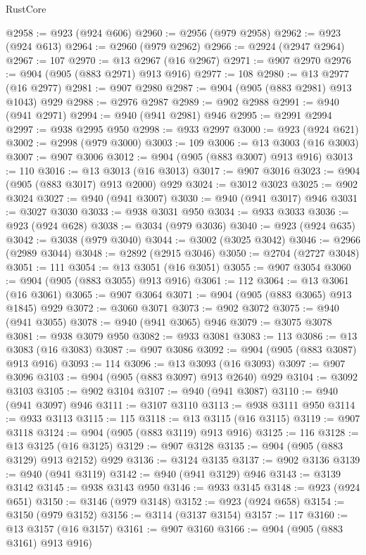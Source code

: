 \begin{lexlean}{RustCore}
\begin{coremodule}
@2958 := @923 (@924 @606)
@2960 := @2956 (@979 @2958)
@2962 := @923 (@924 @613)
@2964 := @2960 (@979 @2962)
@2966 := @2924 (@2947 @2964)
@2967 := 107
@2970 := @13 @2967 (@16 @2967)
@2971 := @907 @2970
@2976 := @904 (@905 (@883 @2971) @913 @916)
@2977 := 108
@2980 := @13 @2977 (@16 @2977)
@2981 := @907 @2980
@2987 := @904 (@905 (@883 @2981) @913 @1043) @929
@2988 := @2976 @2987
@2989 := @902 @2988
@2991 := @940 (@941 @2971)
@2994 := @940 (@941 @2981) @946
@2995 := @2991 @2994
@2997 := @938 @2995 @950
@2998 := @933 @2997
@3000 := @923 (@924 @621)
@3002 := @2998 (@979 @3000)
@3003 := 109
@3006 := @13 @3003 (@16 @3003)
@3007 := @907 @3006
@3012 := @904 (@905 (@883 @3007) @913 @916)
@3013 := 110
@3016 := @13 @3013 (@16 @3013)
@3017 := @907 @3016
@3023 := @904 (@905 (@883 @3017) @913 @2000) @929
@3024 := @3012 @3023
@3025 := @902 @3024
@3027 := @940 (@941 @3007)
@3030 := @940 (@941 @3017) @946
@3031 := @3027 @3030
@3033 := @938 @3031 @950
@3034 := @933 @3033
@3036 := @923 (@924 @628)
@3038 := @3034 (@979 @3036)
@3040 := @923 (@924 @635)
@3042 := @3038 (@979 @3040)
@3044 := @3002 (@3025 @3042)
@3046 := @2966 (@2989 @3044)
@3048 := @2892 (@2915 @3046)
@3050 := @2704 (@2727 @3048)
@3051 := 111
@3054 := @13 @3051 (@16 @3051)
@3055 := @907 @3054
@3060 := @904 (@905 (@883 @3055) @913 @916)
@3061 := 112
@3064 := @13 @3061 (@16 @3061)
@3065 := @907 @3064
@3071 := @904 (@905 (@883 @3065) @913 @1845) @929
@3072 := @3060 @3071
@3073 := @902 @3072
@3075 := @940 (@941 @3055)
@3078 := @940 (@941 @3065) @946
@3079 := @3075 @3078
@3081 := @938 @3079 @950
@3082 := @933 @3081
@3083 := 113
@3086 := @13 @3083 (@16 @3083)
@3087 := @907 @3086
@3092 := @904 (@905 (@883 @3087) @913 @916)
@3093 := 114
@3096 := @13 @3093 (@16 @3093)
@3097 := @907 @3096
@3103 := @904 (@905 (@883 @3097) @913 @2640) @929
@3104 := @3092 @3103
@3105 := @902 @3104
@3107 := @940 (@941 @3087)
@3110 := @940 (@941 @3097) @946
@3111 := @3107 @3110
@3113 := @938 @3111 @950
@3114 := @933 @3113
@3115 := 115
@3118 := @13 @3115 (@16 @3115)
@3119 := @907 @3118
@3124 := @904 (@905 (@883 @3119) @913 @916)
@3125 := 116
@3128 := @13 @3125 (@16 @3125)
@3129 := @907 @3128
@3135 := @904 (@905 (@883 @3129) @913 @2152) @929
@3136 := @3124 @3135
@3137 := @902 @3136
@3139 := @940 (@941 @3119)
@3142 := @940 (@941 @3129) @946
@3143 := @3139 @3142
@3145 := @938 @3143 @950
@3146 := @933 @3145
@3148 := @923 (@924 @651)
@3150 := @3146 (@979 @3148)
@3152 := @923 (@924 @658)
@3154 := @3150 (@979 @3152)
@3156 := @3114 (@3137 @3154)
@3157 := 117
@3160 := @13 @3157 (@16 @3157)
@3161 := @907 @3160
@3166 := @904 (@905 (@883 @3161) @913 @916)

\end{coremodule}
\end{lexlean}
